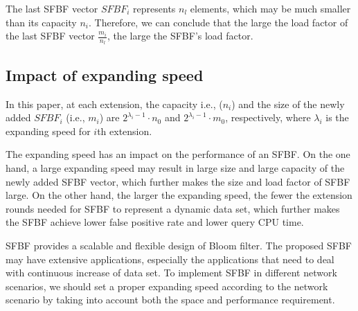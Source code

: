 \documentclass[10pt,journal,letterpaper]{IEEEtran}
\newcommand{\note}[1]{{\sffamily\itshape\bfseries\uline{#1}}}
\begin{document}
The last SFBF vector $SFBF_i$ represents $n_l$ elements,
  which may be much smaller than its capacity $n_i$.
Therefore, we can conclude that the large the load factor of the last SFBF vector $\frac{m_i}{n_{l}}$, the large the SFBF's load factor.

\subsection{Impact of expanding speed}
\label{sub:Impact of expanding speed}
In this paper, at each extension, the capacity i.e., ($n_i$) and the size of the newly added $SFBF_i$ (i.e., $m_i$) are ${{{2^{\lambda_i  - 1}} \cdot {n_0}}}$ and ${{{2^{\lambda_i  - 1}} \cdot {m_0}}}$, respectively, where $\lambda_i$ is the expanding speed for $i$th extension.

The expanding speed has an impact on the performance of an SFBF. On the one hand, a large expanding speed may result in large size and large capacity of the newly added SFBF vector, which further makes the size and load factor of SFBF large. On the other hand, the larger the expanding speed, the fewer the extension rounds needed for SFBF to represent a dynamic data set, which further makes the SFBF achieve lower false positive rate and lower query CPU time.


SFBF provides a scalable and  flexible design of Bloom filter. The proposed SFBF may have extensive applications, especially the applications that need to deal with continuous increase of data set. To implement SFBF in different network scenarios, we should set a proper expanding speed according to the network scenario by taking into account both the space and performance requirement.

%
\end{document}
